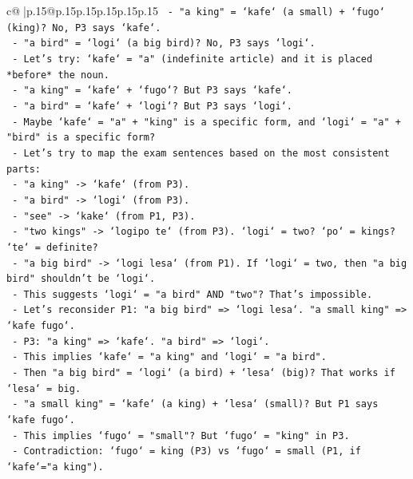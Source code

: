 \documentclass{article}
\begin{document}
{\begin{supertabular}{c@{$\;$}|p{.15\linewidth}@{}p{.15\linewidth}p{.15\linewidth}p{.15\linewidth}p{.15\linewidth}p{.15\linewidth}}
{{{\texttt{                  {-} "a king" = `kafe` (a small) + `fugo` (king)? No, P3 says `kafe`.} \\
\texttt{                  {-} "a bird" = `logi` (a big bird)? No, P3 says `logi`.} \\
\texttt{                {-} Let's try: `kafe` = "a" (indefinite article) and it is placed *before* the noun.} \\
\texttt{                  {-} "a king" = `kafe` + `fugo`? But P3 says `kafe`.} \\
\texttt{                  {-} "a bird" = `kafe` + `logi`? But P3 says `logi`.} \\
\texttt{                {-} Maybe `kafe` = "a" + "king" is a specific form, and `logi` = "a" + "bird" is a specific form?} \\
\texttt{                {-} Let's try to map the exam sentences based on the most consistent parts:} \\
\texttt{                  {-} "a king" {-}> `kafe` (from P3).} \\
\texttt{                  {-} "a bird" {-}> `logi` (from P3).} \\
\texttt{                  {-} "see" {-}> `kake` (from P1, P3).} \\
\texttt{                  {-} "two kings" {-}> `logipo te` (from P3). `logi` = two? `po` = kings? `te` = definite?} \\
\texttt{                  {-} "a big bird" {-}> `logi lesa` (from P1). If `logi` = two, then "a big bird" shouldn't be `logi`.} \\
\texttt{                  {-} This suggests `logi` = "a bird" AND "two"? That's impossible.} \\
\texttt{                  {-} Let's reconsider P1: "a big bird" => `logi lesa`. "a small king" => `kafe fugo`.} \\
\texttt{                  {-} P3: "a king" => `kafe`. "a bird" => `logi`.} \\
\texttt{                  {-} This implies `kafe` = "a king" and `logi` = "a bird".} \\
\texttt{                  {-} Then "a big bird" = `logi` (a bird) + `lesa` (big)? That works if `lesa` = big.} \\
\texttt{                  {-} "a small king" = `kafe` (a king) + `lesa` (small)? But P1 says `kafe fugo`.} \\
\texttt{                  {-} This implies `fugo` = "small"? But `fugo` = "king" in P3.} \\
\texttt{                  {-} Contradiction: `fugo` = king (P3) vs `fugo` = small (P1, if `kafe`="a king").} \\
}}}
\end{supertabular}}
\end{document}
